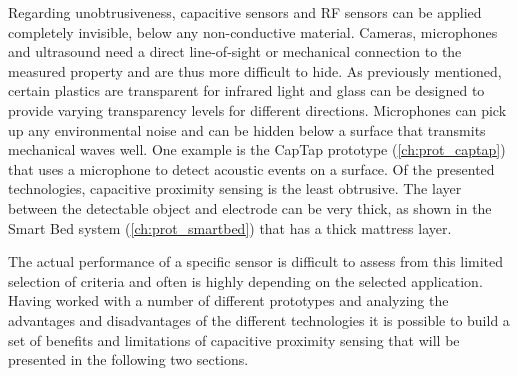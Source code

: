 Regarding unobtrusiveness, capacitive sensors and RF sensors can be applied completely invisible, below any non-conductive material. Cameras, microphones and ultrasound need a direct line-of-sight or mechanical connection to the measured property and are thus more difficult to hide. As previously mentioned, certain plastics are transparent for infrared light and glass can be designed to provide varying transparency levels for different directions. Microphones can pick up any environmental noise and can be hidden below a surface that transmits mechanical waves well. One example is the CapTap prototype (\ref{ch:prot_captap}) that uses a microphone to detect acoustic events on a surface. Of the presented technologies, capacitive proximity sensing is the least obtrusive. The layer between the detectable object and electrode can be very thick, as shown in the Smart Bed system (\ref{ch:prot_smartbed}) that has a thick mattress layer.

The actual performance of a specific sensor is difficult to assess from this limited selection of criteria and often is highly depending on the selected application. Having worked with a number of different prototypes and analyzing the advantages and disadvantages of the different technologies it is possible to build a set of benefits and limitations of capacitive proximity sensing that will be presented in the following two sections.
